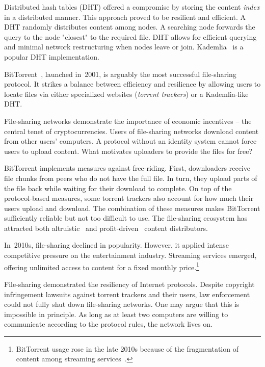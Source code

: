 Distributed hash tables (DHT) offered a compromise by storing the content \textit{index} in a distributed manner.
This approach proved to be resilient and efficient.
A DHT randomly distributes content among nodes.
A searching node forwards the query to the node "closest" to the required file.
DHT allows for efficient querying and minimal network restructuring when nodes leave or join.
Kademlia~\cite{Maymounkov2002} is a popular DHT implementation.

BitTorrent~\cite{Pouwelse2005}, launched in~2001, is arguably the most successful file-sharing protocol.
It strikes a balance between efficiency and resilience by allowing users to locate files via either specialized websites (\textit{torrent trackers}) or a Kademlia-like DHT.

File-sharing networks demonstrate the importance of economic incentives -- the central tenet of cryptocurrencies.
Users of file-sharing networks download content from other users' computers.
A protocol without an identity system cannot force users to upload content.
What motivates uploaders to provide the files for free?

BitTorrent implements measures against free-riding.
First, downloaders receive file chunks from peers who do not have the full file.
In turn, they upload parts of the file back while waiting for their download to complete.
On top of the protocol-based measures, some torrent trackers also account for how much their users upload and download.
The combination of these measures makes BitTorrent sufficiently reliable but not too difficult to use.
The file-sharing ecosystem has attracted both altruistic~\cite{Rehn2004} and profit-driven~\cite{Rumin2010} content distributors.

In~2010s, file-sharing declined in popularity.
However, it applied intense competitive pressure on the entertainment industry.
Streaming services emerged, offering unlimited access to content for a fixed monthly price.\footnote{BitTorrent usage rose in the late 2010s because of the fragmentation of content among streaming services~\cite{Bode2018}.}

File-sharing demonstrated the resiliency of Internet protocols.
Despite copyright infringement lawsuits against torrent trackers and their users, law enforcement could not fully shut down file-sharing networks.
One may argue that this is impossible in principle.
As long as at least two computers are willing to communicate according to the protocol rules, the network lives on.

